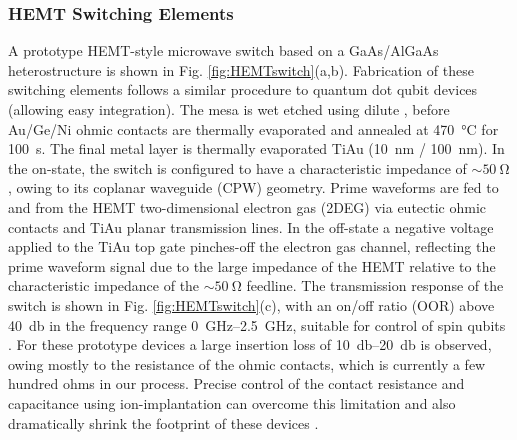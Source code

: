 \subsubsection{HEMT Switching Elements}
A prototype HEMT-style microwave switch based on a GaAs/AlGaAs heterostructure is shown in Fig. \ref{fig:HEMTswitch}(a,b). Fabrication of these switching elements follows a similar procedure to quantum dot qubit devices (allowing easy integration). The mesa is wet etched using dilute , before Au/Ge/Ni ohmic contacts are thermally evaporated and annealed at \SI{470}{\celsius} for \SI{100}{\second}. The final metal layer is thermally evaporated TiAu (\SI{10}{\nano\meter} / \SI{100}{\nano\meter}). In the on-state, the switch is configured to have a characteristic impedance of $\sim \SI{50}{\ohm}$, owing to its coplanar waveguide (CPW) geometry. Prime waveforms are fed to and from the HEMT two-dimensional electron gas (2DEG) via eutectic ohmic contacts and TiAu planar transmission lines. In the off-state a negative voltage applied to the TiAu top gate pinches-off the electron gas channel, reflecting the prime waveform signal due to the large impedance of the HEMT relative to the characteristic impedance of the $\sim \SI{50}{\ohm}$ feedline. The transmission response of the switch is shown in Fig. \ref{fig:HEMTswitch}(c), with an on/off ratio (OOR) above \SI{40}{\decibel} in the frequency range \SIrange{0}{2.5}{\giga\hertz}, suitable for control of spin qubits \cite{PhysRevLett.104.236802}. For these prototype devices a large insertion loss of \SIrange{10}{20}{\decibel} is observed, owing mostly to the resistance of the ohmic contacts, which is currently a few hundred ohms in our process. Precise control of the contact resistance and capacitance using ion-implantation can overcome this limitation and also dramatically shrink the footprint of these devices \cite{PIOTROWSKA1983179, doi:10.1063/1.118182}.


